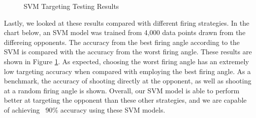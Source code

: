 \documentclass{article}
\theoremstyle{plain}
\theoremstyle{definition}
\theoremstyle{remark}
\begin{document}
\begin{figure}[h]
	\centering
\caption{SVM Targeting Testing Results}
\label{target:all}
\end{figure}

Lastly, we looked at these results compared with different firing strategies. In the chart below, an SVM model was trained from 4,000 data points drawn from the differeing opponents. The accuracy from the best firing angle according to the SVM is compared with the accuracy from the worst firing angle. These results are shown in Figure \ref{target:all}. As expected, choosing the worst firing angle has an extremely low targeting accuracy when compared with employing the best firing angle. As a benchmark, the accuracy of shooting directly at the opponent, as well as shooting at a random firing angle is shown. Overall, our SVM model is able to perform better at targeting the opponent than these other strategies, and we are capable of achieving ~90\% accuracy using these SVM models. 
\end{document}
